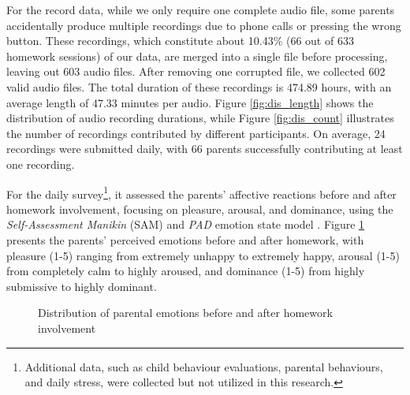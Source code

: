 For the record data, while we only require one complete audio file, some parents accidentally produce multiple recordings due to phone calls or pressing the wrong button. These recordings, which constitute about 10.43\% (66 out of 633 homework sessions) of our data, are merged into a single file before processing, leaving out 603 audio files. After removing one corrupted file, we collected 602 valid audio files. The total duration of these recordings is 474.89 hours, with an average length of 47.33 minutes per audio. Figure \ref{fig:dis_length} shows the distribution of audio recording durations, while Figure \ref{fig:dis_count} illustrates the number of recordings contributed by different participants. On average, 24 recordings were submitted daily, with 66 parents successfully contributing at least one recording. 

For the daily survey\footnote{Additional data, such as child behaviour evaluations, parental behaviours, and daily stress, were collected but not utilized in this research.}, it assessed the parents' affective reactions before and after homework involvement, focusing on pleasure, arousal, and dominance, using the \textit{Self-Assessment Manikin} (SAM) \cite{bradley1994measuring} and \textit{PAD} emotion state model \cite{mehrabian1974approach}. Figure \ref{fig:self-report dis} presents the parents' perceived emotions before and after homework, with pleasure (1-5) ranging from extremely unhappy to extremely happy, arousal (1-5) from completely calm to highly aroused, and dominance (1-5) from highly submissive to highly dominant.

\begin{figure}
	\hspace{0cm}
    \caption{Distribution of parental emotions before and after homework involvement}
    \label{fig:self-report dis}
\end{figure}

